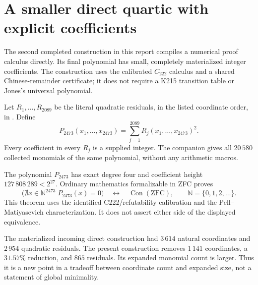 \section{A smaller direct quartic with explicit coefficients}
\label{sec:direct-oriented}

The second completed construction in this report compiles a numerical proof
calculus directly.  Its final polynomial has small, completely materialized
integer coefficients.  The construction uses the calibrated $C_{222}$
calculus and a shared Chinese-remainder certificate; it does not require a
K215 transition table or Jones's universal polynomial.

Let $R_1,\ldots,R_{2089}$ be the literal quadratic residuals, in the
listed coordinate order, in . Define
\begin{equation}\label{eq:direct2473}
 P_{2473}(x_1,\ldots,x_{2473})
       =\sum_{j=1}^{2089}R_j(x_1,\ldots,x_{2473})^2.
\end{equation}
Every coefficient in every $R_j$ is a supplied integer. The companion
 gives all $20\,580$ collected
monomials of the same polynomial, without any arithmetic macros.

\begin{theorem}
\label{thm:direct2473}
The polynomial $P_{2473}$ has exact degree four and coefficient height
$127\,808\,289<2^{27}$. Ordinary mathematics formalizable in ZFC proves
\[
 \bigl(\nexists x\in\mathbb N^{2473}\;P_{2473}(x)=0\bigr)
       \quad\longleftrightarrow\quad \operatorname{Con}(\mathrm{ZFC}),
 \qquad \mathbb N=\{0,1,2,\ldots\}.
\]
This theorem uses the identified C222/refutability calibration and the
Pell--Matiyasevich characterization. It does not assert either side of the
displayed equivalence.
\end{theorem}

The materialized incoming direct construction had $3\,614$ natural
coordinates and $2\,954$ quadratic residuals. The present construction
removes $1\,141$ coordinates, a $31.57\%$ reduction, and $865$ residuals.
Its expanded monomial count is larger. Thus it is a new point in a tradeoff
between coordinate count and expanded size, not a statement of global
minimality.

